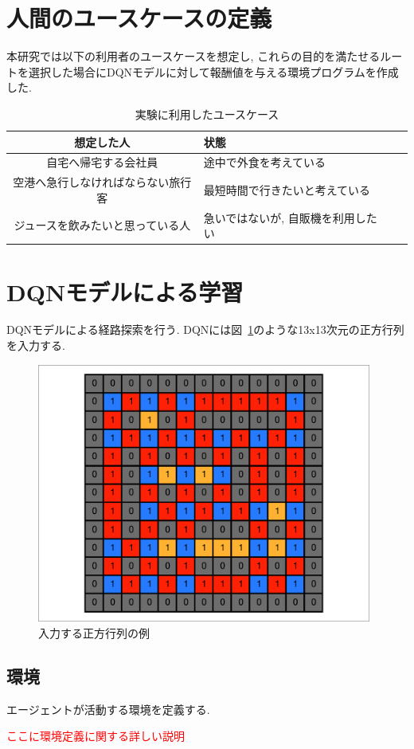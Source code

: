 \section{人間のユースケースの定義}

本研究では以下の利用者のユースケースを想定し, これらの目的を満たせるルートを選択した場合にDQNモデルに対して報酬値を与える環境プログラムを作成した.

\begin{table}[h]
    \caption{実験に利用したユースケース}
    \label{table:SpeedOfLight}
    \centering
    \begin{tabular}{clll}
      \hline
        想定した人 & 状態 \\
        \hline \hline
        自宅へ帰宅する会社員 & 途中で外食を考えている \\
        空港へ急行しなければならない旅行客 & 最短時間で行きたいと考えている \\
        ジュースを飲みたいと思っている人 & 急いではないが, 自販機を利用したい \\
      \hline
    \end{tabular}
  \end{table}
  



\section{DQNモデルによる学習}

DQNモデルによる経路探索を行う. DQNには図~\ref{ll_tensor}のような13x13次元の正方行列を入力する.


\begin{figure}[H]
    \centering  %
    \includegraphics[clip,width = 11.0cm]{assets/MAP_6.eps}
    \caption{入力する正方行列の例} \label{ll_tensor}
\end{figure}
  

\subsection{環境}

エージェントが活動する環境を定義する.

\textcolor{red}{ここに環境定義に関する詳しい説明}

